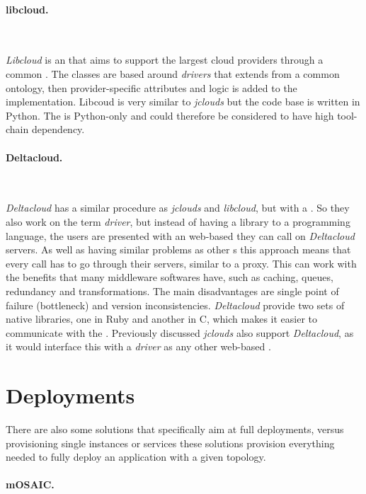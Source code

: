 \paragraph{libcloud.}~\cite{libcloud}

\emph{Libcloud} is an  that aims to support the largest cloud providers through a common . 
The classes are based around \emph{drivers} that extends from a common ontology, 
then provider-specific attributes and logic is added to the implementation.
Libcoud is very similar to \emph{jclouds} but the  code base is written in Python. 
The  is Python-only and could therefore be considered to have high tool-chain dependency.

\paragraph{Deltacloud.}~\cite{deltacloud}

\emph{Deltacloud} has a similar procedure as \emph{jclouds} and \emph{libcloud}, but with a  . 
So they also work on the term \emph{driver}, but instead of having a library to a 
programming language,
the users are presented with an web-based  they can call on \emph{Deltacloud} servers. 
As well as having similar problems as other s this approach means 
that every call has to go through their servers, similar to a proxy. 
This can work with the benefits that many middleware softwares have, such as caching, queues, 
redundancy and transformations.
The main disadvantages are single point of failure (bottleneck) and version inconsistencies.
\emph{Deltacloud} provide two sets of native libraries, one in Ruby and another in C, which
makes it easier to communicate with the  .
Previously discussed \emph{jclouds} also support \emph{Deltacloud}, as it would interface this
with a \emph{driver} as any other web-based .

\section{Deployments}

There are also some solutions that specifically aim at full deployments,
versus provisioning single instances or services these solutions
provision everything needed to fully deploy an application with a given topology.

\paragraph{mOSAIC.}~\cite{portable:petcu12} 

